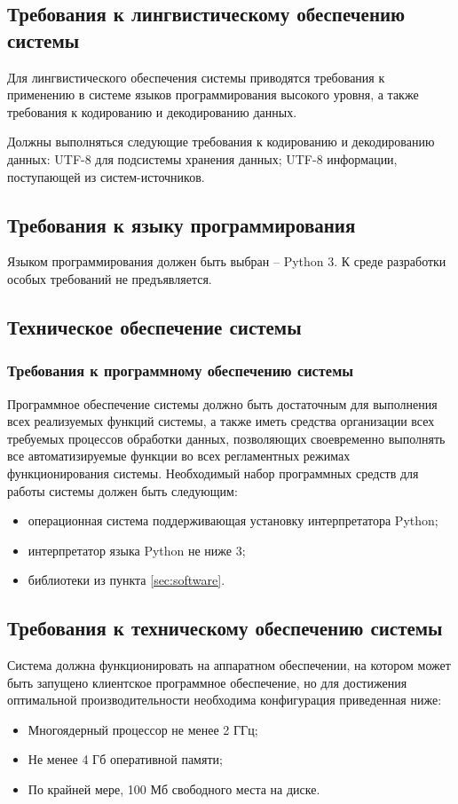 \subsection{Требования к лингвистическому обеспечению системы}
Для лингвистического обеспечения системы приводятся требования к применению в системе языков программирования высокого уровня, а также требования к кодированию и декодированию данных.

Должны выполняться следующие требования к кодированию и декодированию данных: UTF-8 для подсистемы хранения 
данных; UTF-8 информации, поступающей из систем-источников.

\subsection{Требования к языку программирования}
Языком программирования должен быть выбран -- Python 3. К среде разработки особых требований не предъявляется.

\subsection{Техническое обеспечение системы}
\subsubsection{Требования к программному обеспечению системы}
Программное обеспечение системы должно быть достаточным для выполнения всех реализуемых функций системы, а 
также иметь средства организации всех требуемых процессов обработки данных, позволяющих своевременно 
выполнять все автоматизируемые функции во всех регламентных режимах функционирования системы. Необходимый 
набор программных средств для работы системы должен быть следующим:
\begin{itemize}
    \item операционная система поддерживающая установку интерпретатора Python;
    \item интерпретатор языка Python не ниже 3;
    \item библиотеки из пункта \ref{sec:software}.
\end{itemize}

\subsection{Требования к техническому обеспечению системы}
Система должна функционировать на аппаратном обеспечении, на котором может быть запущено клиентское 
программное обеспечение, но для достижения оптимальной производительности необходима конфигурация приведенная 
ниже:
\begin{itemize}
    \item Многоядерный процессор не менее 2 ГГц;
    \item Не менее 4 Гб оперативной памяти;
    \item По крайней мере, 100 Мб свободного места на диске.
\end{itemize}

